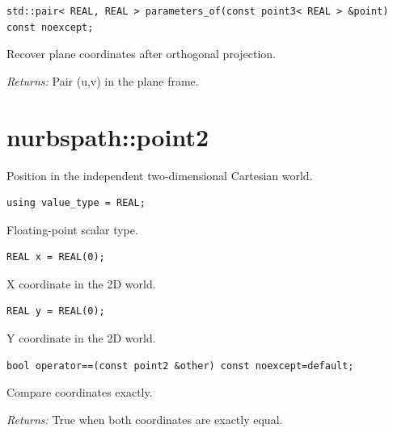 \par\noindent\begin{minipage}{\linewidth}
\begin{lstlisting}[style=apireference]
std::pair< REAL, REAL > parameters_of(const point3< REAL > &point) const noexcept;
\end{lstlisting}
{\footnotesize Recover plane coordinates after orthogonal projection.\par}
{\footnotesize\textit{Returns:} Pair (u,v) in the plane frame.\par}
\end{minipage}\par\vspace{1pt}
\section{nurbspath::point2}
Position in the independent two-dimensional Cartesian world.
\par\noindent\begin{minipage}{\linewidth}
\begin{lstlisting}[style=apireference]
using value_type = REAL;
\end{lstlisting}
{\footnotesize Floating-point scalar type.\par}
\end{minipage}\par\vspace{1pt}
\par\noindent\begin{minipage}{\linewidth}
\begin{lstlisting}[style=apireference]
REAL x = REAL(0);
\end{lstlisting}
{\footnotesize X coordinate in the 2D world.\par}
\end{minipage}\par\vspace{1pt}
\par\noindent\begin{minipage}{\linewidth}
\begin{lstlisting}[style=apireference]
REAL y = REAL(0);
\end{lstlisting}
{\footnotesize Y coordinate in the 2D world.\par}
\end{minipage}\par\vspace{1pt}
\par\noindent\begin{minipage}{\linewidth}
\begin{lstlisting}[style=apireference]
bool operator==(const point2 &other) const noexcept=default;
\end{lstlisting}
{\footnotesize Compare coordinates exactly.\par}
{\footnotesize\textit{Returns:} True when both coordinates are exactly equal.\par}
\end{minipage}\par\vspace{1pt}
